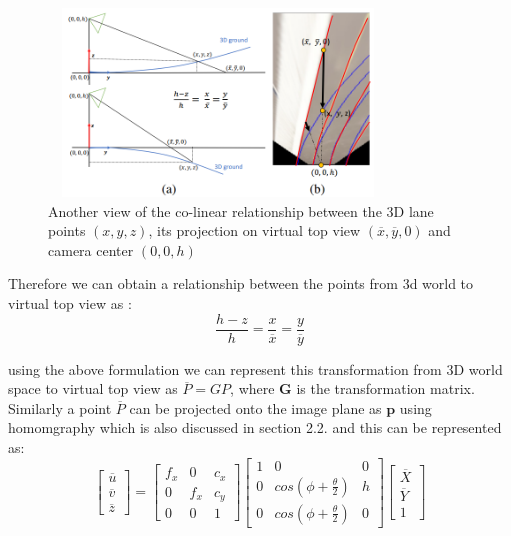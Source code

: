       \begin{figure}[h]
    \centering
    \includegraphics[width=9cm, height=5cm]{images/collinear_3dlane.png}
    \caption{Another view of the co-linear relationship between the 3D lane points $(x,y,z)$, its projection on virtual top view $(\overline{x}, \overline{y},0)$ and camera center $(0,0,h)$ \cite{guo2020gen}}
    \end{figure}

    Therefore we can obtain a relationship between the points from 3d world to virtual top view as :
    \begin{equation}
        \frac{h-z}{h} =\frac{x}{\overline{x}}=\frac{y}{\overline{y}} 
    \end{equation}
    
    using the above formulation we can represent this transformation from 3D world space to virtual top view as \textbf{$\overline{P} = GP$}, where \textbf{G} is the transformation matrix. Similarly a point \textbf{$\overline{P}$} can be projected onto the image plane as $\textbf{p}$ using homomgraphy which is also discussed in section 2.2. and this can be represented as: 
    \begin{equation}
       \begin{bmatrix}\overline{u}  \\\overline{v} \\ \overline{z}\end{bmatrix} = \begin{bmatrix} f_{x} & 0& c_{x}  \\0 &f_{x} & c_{y} \\ 0 & 0 & 1     \end{bmatrix}\begin{bmatrix} 1 & 0& 0  \\0 &cos(\phi+ \frac{\theta}{2}) & h \\ 0 &cos(\phi+ \frac{\theta}{2}) & 0     \end{bmatrix}\begin{bmatrix}\overline{X}  \\\overline{Y} \\ 1\end{bmatrix}
    \end{equation}


